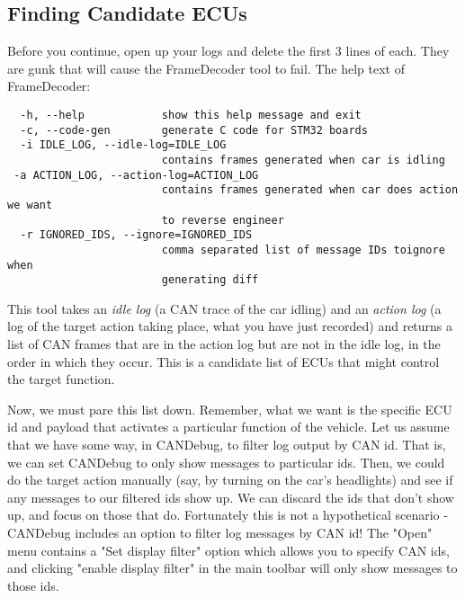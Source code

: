 \documentclass[12pt]{article}
\begin{document}
\subsection{Finding Candidate ECUs}
Before you continue, open up your logs and delete the first 3 lines of each.
They are gunk that will cause the FrameDecoder tool to fail. The help text of
FrameDecoder:
\begin{verbatim}
  -h, --help            show this help message and exit
  -c, --code-gen        generate C code for STM32 boards
  -i IDLE_LOG, --idle-log=IDLE_LOG
                        contains frames generated when car is idling
 -a ACTION_LOG, --action-log=ACTION_LOG
                        contains frames generated when car does action we want
                        to reverse engineer
  -r IGNORED_IDS, --ignore=IGNORED_IDS
                        comma separated list of message IDs toignore when
                        generating diff
\end{verbatim}
This tool takes an \textit{idle log} (a CAN trace of the car idling) and an
\textit{action log} (a log of the target action taking place, what you have
just recorded) and returns a list of CAN frames that are in the action log but
are not in the idle log, in the order in which they occur. This is a candidate
list of ECUs that might control the target function. 

Now, we must pare this list down. Remember, what we want is the specific
ECU id and payload that activates a particular function of the vehicle. Let us
assume that we have some way, in CANDebug, to filter log output by CAN id. That
is, we can set CANDebug to only show messages to particular ids. Then, we could do the
target action manually (say, by turning on the car's headlights) and see if any
messages to our filtered ids show up. We can discard the ids that don't show
up, and focus on those that do. Fortunately this is not a hypothetical
scenario - CANDebug includes an option to filter log messages by CAN id! The
"Open" menu contains a "Set display filter" option which allows you to specify
CAN ids, and clicking "enable display filter" in the main toolbar will only
show messages to those ids. 
\end{document}
